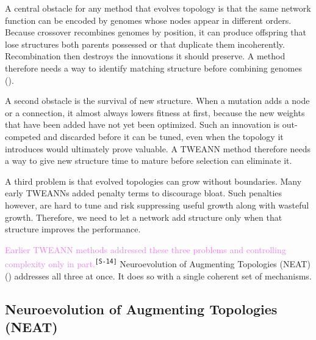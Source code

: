 \documentclass[12pt]{article}
\newcommand{\revID}[1]{\textsuperscript{\scriptsize\texttt{[#1]}}}
\newcommand{\revStyle}[2]{\textcolor{violet}{#2}\revID{#1}}   %
\begin{document}
A central obstacle for any method that evolves topology is that the same network function can be encoded by genomes whose nodes appear in different orders.
Because crossover recombines genomes by position, it can produce offspring that lose structures both parents possessed or that duplicate them incoherently.
Recombination then destroys the innovations it should preserve.
A method therefore needs a way to identify matching structure before combining genomes (\cite{stanley_evolving_2002}).

A second obstacle is the survival of new structure.
When a mutation adds a node or a connection, it almost always lowers fitness at first, because the new weights that have been added have not yet been optimized.
Such an innovation is out-competed and discarded before it can be tuned, even when the topology it introduces would ultimately prove valuable.
A TWEANN method therefore needs a way to give new structure time to mature before selection can eliminate it.

A third problem is that evolved topologies can grow without boundaries.
Many early TWEANNs added penalty terms to discourage bloat.
Such penalties however, are hard to tune and risk suppressing useful growth along with wasteful growth.
Therefore, we need to let a network add structure only when that structure improves the performance.

\revStyle{S-14}{Earlier TWEANN methods addressed these three problems and controlling complexity only in part.}
Neuroevolution of Augmenting Topologies (NEAT) (\cite{stanley_evolving_2002}) addresses all three at once.
It does so with a single coherent set of mechanisms.


\subsection{Neuroevolution of Augmenting Topologies (NEAT)}
\label{subsec:neuroevolution-of-augmenting-topologies-neat}
\end{document}
